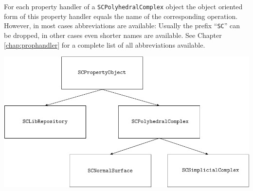 \documentclass[a4paper,11pt]{report}
\begin{document}
{{ For each property handler of a \texttt{SCPolyhedralComplex} object the object oriented form of this property handler equals the name of
the corresponding operation. However, in most cases abbreviations are
available: Usually the prefix ``\texttt{SC}'' can be dropped, in other cases even shorter names are available. See
Chapter \ref{chap:prophandler} for a complete list of all abbreviations available. }

 

  \begin{center}
\includegraphics[width=1.0\textwidth]{figures/flowchart.pdf}\\
\end{center}  

 }
\end{document}
